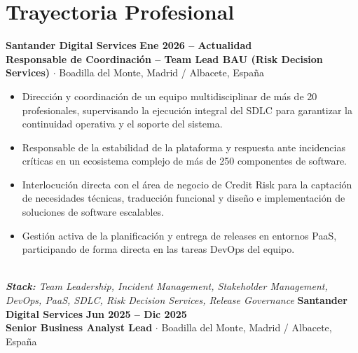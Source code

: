 \documentclass[10pt,a4paper]{article}
\begin{document}
\section{Trayectoria Profesional}
\noindent\textbf{\large Santander Digital Services} \hfill {\color{SynthBlue}\textbf{Ene 2026 -- Actualidad}} \\
{\color{SynthPink}\textbf{Responsable de Coordinación -- Team Lead BAU (Risk Decision Services)}} $\cdot$ {\color{SlateGray}Boadilla del Monte, Madrid / Albacete, España}
\begin{itemize}[leftmargin=1.5em, itemsep=1.5pt, topsep=2pt]
    \item Dirección y coordinación de un equipo multidisciplinar de más de 20 profesionales, supervisando la ejecución integral del SDLC para garantizar la continuidad operativa y el soporte del sistema.
    \item Responsable de la estabilidad de la plataforma y respuesta ante incidencias críticas en un ecosistema complejo de más de 250 componentes de software.
    \item Interlocución directa con el área de negocio de Credit Risk para la captación de necesidades técnicas, traducción funcional y diseño e implementación de soluciones de software escalables.
    \item Gestión activa de la planificación y entrega de releases en entornos PaaS, participando de forma directa en las tareas DevOps del equipo.
\end{itemize}
\\\noindent\textit{\footnotesize \textbf{Stack:} Team Leadership, Incident Management, Stakeholder Management, DevOps, PaaS, SDLC, Risk Decision Services, Release Governance}
\vspace{10pt}
\noindent\textbf{\large Santander Digital Services} \hfill {\color{SynthBlue}\textbf{Jun 2025 -- Dic 2025}} \\
{\color{SynthPink}\textbf{Senior Business Analyst Lead}} $\cdot$ {\color{SlateGray}Boadilla del Monte, Madrid / Albacete, España}
\end{document}
